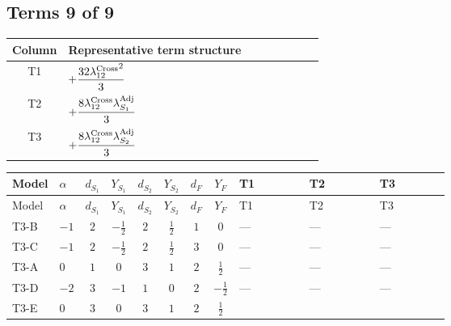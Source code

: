 \documentclass[8pt]{article}
\begin{document}
\begin{landscape}
\subsection*{Terms 9 of 9}
\begin{center}
\begin{tabular}{@{}c >{\raggedright\arraybackslash}p{0.82\linewidth}@{}}
\toprule
Column & Representative term structure \\
\midrule
T1 & \(\displaystyle +\frac{32 {\lambda_{12}^{\rm Cross}}^2}{3}\) \\
\midrule
T2 & \(\displaystyle +\frac{8 {\lambda_{12}^{\rm Cross}} {\lambda_{S_1}^{\rm Adj}}}{3}\) \\
\midrule
T3 & \(\displaystyle +\frac{8 {\lambda_{12}^{\rm Cross}} {\lambda_{S_2}^{\rm Adj}}}{3}\) \\
\midrule
\bottomrule
\end{tabular}
\end{center}
\smallskip
\tiny
\begin{longtable}{@{}llcccccc >{\raggedright\arraybackslash}p{0.21\linewidth} >{\raggedright\arraybackslash}p{0.21\linewidth} >{\raggedright\arraybackslash}p{0.21\linewidth}@{}}
\toprule
Model & $\alpha$ & $d_{S_1}$ & $Y_{S_1}$ & $d_{S_2}$ & $Y_{S_2}$ & $d_F$ & $Y_F$ & T1 & T2 & T3 \\
\midrule
\endfirsthead
\toprule
Model & $\alpha$ & $d_{S_1}$ & $Y_{S_1}$ & $d_{S_2}$ & $Y_{S_2}$ & $d_F$ & $Y_F$ & T1 & T2 & T3 \\
\midrule
\endhead
T3-B & $-1$ & $2$ & $-\frac{1}{2}$ & $2$ & $\frac{1}{2}$ & $1$ & $0$ & --- & --- & --- \\
\midrule
T3-C & $-1$ & $2$ & $-\frac{1}{2}$ & $2$ & $\frac{1}{2}$ & $3$ & $0$ & --- & --- & --- \\
\midrule
T3-A & $0$ & $1$ & $0$ & $3$ & $1$ & $2$ & $\frac{1}{2}$ & --- & --- & --- \\
\midrule
T3-D & $-2$ & $3$ & $-1$ & $1$ & $0$ & $2$ & $-\frac{1}{2}$ & --- & --- & --- \\
\midrule
T3-E & $0$ & $3$ & $0$ & $3$ & $1$ & $2$ & $\frac{1}{2}$ & \scriptsize\adjustbox{max width=\linewidth}{$\begin{gathered} +\frac{32 {\lambda_{12}^{\rm Cross}}^2}{3}\end{gathered}$} & \scriptsize\adjustbox{max width=\linewidth}{$\begin{gathered} +\frac{8 {\lambda_{12}^{\rm Cross}} {\lambda_{S_1}^{\rm Adj}}}{3}\end{gathered}$} & \scriptsize\adjustbox{max width=\linewidth}{$\begin{gathered} +\frac{8 {\lambda_{12}^{\rm Cross}} {\lambda_{S_2}^{\rm Adj}}}{3}\end{gathered}$} \\
\midrule
\bottomrule
\end{longtable}
\clearpage

\end{landscape}
\end{document}
